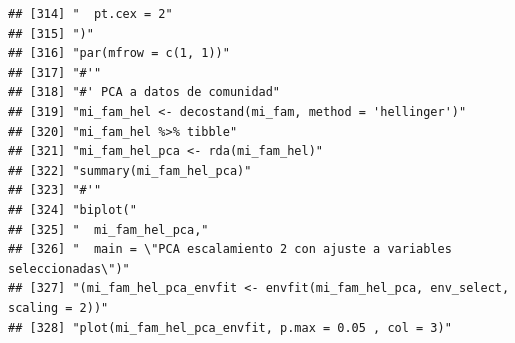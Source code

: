 \documentclass[11pt,]{article}
\begin{document}
\begin{verbatim}
## [314] "  pt.cex = 2"                                                                                                                                                          
## [315] ")"                                                                                                                                                                     
## [316] "par(mfrow = c(1, 1))"                                                                                                                                                  
## [317] "#'"                                                                                                                                                                    
## [318] "#' PCA a datos de comunidad"                                                                                                                                           
## [319] "mi_fam_hel <- decostand(mi_fam, method = 'hellinger')"                                                                                                                 
## [320] "mi_fam_hel %>% tibble"                                                                                                                                                 
## [321] "mi_fam_hel_pca <- rda(mi_fam_hel)"                                                                                                                                     
## [322] "summary(mi_fam_hel_pca)"                                                                                                                                               
## [323] "#'"                                                                                                                                                                    
## [324] "biplot("                                                                                                                                                               
## [325] "  mi_fam_hel_pca,"                                                                                                                                                     
## [326] "  main = \"PCA escalamiento 2 con ajuste a variables seleccionadas\")"                                                                                                 
## [327] "(mi_fam_hel_pca_envfit <- envfit(mi_fam_hel_pca, env_select, scaling = 2))"                                                                                            
## [328] "plot(mi_fam_hel_pca_envfit, p.max = 0.05 , col = 3)"                                                                                                                   

\end{verbatim}
\end{document}
